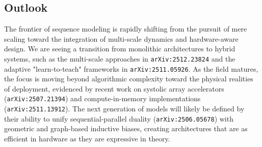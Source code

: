 \documentclass[11pt]{article}
\begin{document}
\subsection{Outlook}

The frontier of sequence modeling is rapidly shifting from the pursuit of mere scaling toward the integration of multi-scale dynamics and hardware-aware design. We are seeing a transition from monolithic architectures to hybrid systems, such as the multi-scale approaches in \texttt{arXiv:2512.23824} and the adaptive "learn-to-teach" frameworks in \texttt{arXiv:2511.05926}. As the field matures, the focus is moving beyond algorithmic complexity toward the physical realities of deployment, evidenced by recent work on systolic array accelerators (\texttt{arXiv:2507.21394}) and compute-in-memory implementations (\texttt{arXiv:2511.13912}). The next generation of models will likely be defined by their ability to unify sequential-parallel duality (\texttt{arXiv:2506.05678}) with geometric and graph-based inductive biases, creating architectures that are as efficient in hardware as they are expressive in theory.
\end{document}
